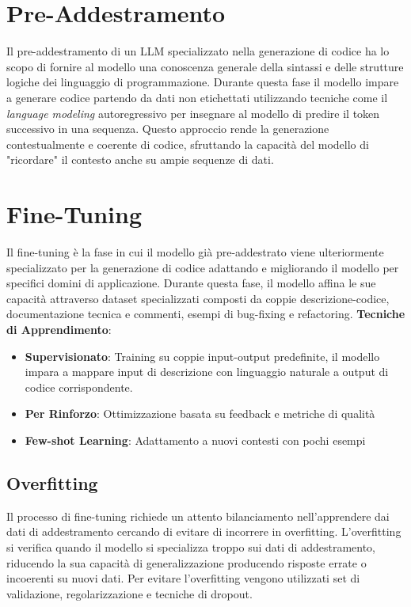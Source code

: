 \documentclass[12pt,a4paper,openright,twoside]{book}
\begin{document}
\section{Pre-Addestramento}
Il pre-addestramento di un LLM specializzato nella generazione di codice ha lo scopo di fornire al modello una conoscenza generale della sintassi e delle strutture logiche dei linguaggio di programmazione.
Durante questa fase il modello impare a generare codice partendo da dati non etichettati utilizzando tecniche come il \emph{language modeling} autoregressivo per insegnare al modello di predire il token successivo in una sequenza.
Questo approccio rende la generazione contestualmente e coerente di codice, sfruttando la capacità del modello di "ricordare" il contesto anche su ampie sequenze di dati.
\section{Fine-Tuning}
Il fine-tuning è la fase in cui il modello già pre-addestrato viene ulteriormente specializzato per la generazione di codice adattando e migliorando il modello per specifici domini di applicazione.
Durante questa fase, il modello affina le sue capacità attraverso dataset specializzati composti da coppie descrizione-codice, documentazione tecnica e commenti, esempi di bug-fixing e refactoring.
\textbf{Tecniche di Apprendimento}:
    \begin{itemize}
        \item \textbf{Supervisionato}: Training su coppie input-output predefinite, il modello impara a mappare input di descrizione con linguaggio naturale a output di codice corrispondente.
        \item \textbf{Per Rinforzo}: Ottimizzazione basata su feedback e metriche di qualità
        \item \textbf{Few-shot Learning}: Adattamento a nuovi contesti con pochi esempi
    \end{itemize}

\subsection{Overfitting}
Il processo di fine-tuning richiede un attento bilanciamento nell'apprendere dai dati di addestramento cercando di evitare di incorrere in overfitting.
L'overfitting si verifica quando il modello si specializza troppo sui dati di addestramento, riducendo la sua capacità di generalizzazione producendo risposte errate o incoerenti su nuovi dati.
Per evitare l'overfitting vengono utilizzati set di validazione, regolarizzazione e tecniche di dropout.
\end{document}
